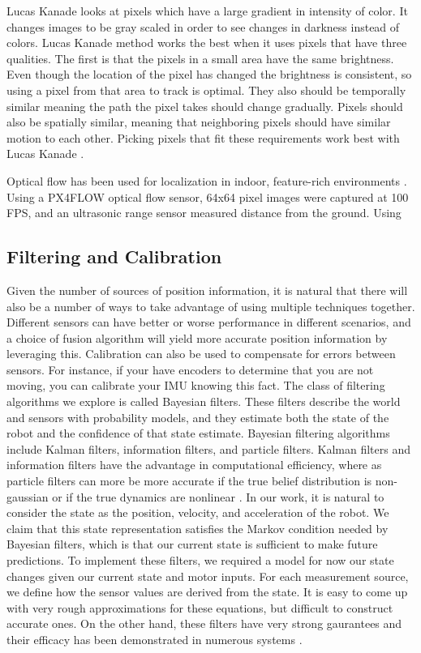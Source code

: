 \documentclass{article}
\begin{document}
    Lucas Kanade looks at pixels which have a large gradient in intensity of color. It changes images to be gray scaled in order to see changes in darkness instead of colors. Lucas Kanade method works the best when it uses pixels that have three qualities. The first is that the pixels in a small area have the same brightness. Even though the location of the pixel has changed the brightness is consistent, so using a pixel from that area to track is optimal. They also should be temporally similar meaning the path the pixel takes should change gradually. Pixels should also be spatially similar, meaning that neighboring pixels should have similar motion to each other. Picking pixels that fit these requirements work best with Lucas Kanade \cite{sun_optical_2008}.

    Optical flow has been used for localization in indoor, feature-rich environments \cite{gao_qingji_onboard_2015}. Using a PX4FLOW optical flow sensor, 64x64 pixel images were captured at 100 FPS, and an ultrasonic range sensor measured distance from the ground. Using

  \subsection{Filtering and Calibration} \label{filtering}

  Given the number of sources of position information, it is natural that there will also be a number of ways to take advantage of using multiple techniques together. Different sensors can have better or worse performance in different scenarios, and a choice of fusion algorithm will yield more accurate position information by leveraging this. Calibration can also be used to compensate for errors between sensors. For instance, if your have encoders to determine that you are not moving, you can calibrate your IMU knowing this fact. The class of filtering algorithms we explore is called Bayesian filters. These filters describe the world and sensors with probability models, and they estimate both the state of the robot and the confidence of that state estimate. Bayesian filtering algorithms include Kalman filters, information filters, and particle filters. Kalman filters and information filters have the advantage in computational efficiency, where as particle filters can more be more accurate if the true belief distribution is non-gaussian or if the true dynamics are nonlinear \cite{thrun_probabilistic_2005}. In our work, it is natural to consider the state as the position, velocity, and acceleration of the robot. We claim that this state representation satisfies the Markov condition needed by Bayesian filters, which is that our current state is sufficient to make future predictions. To implement these filters, we required a model for now our state changes given our current state and motor inputs. For each measurement source, we define how the sensor values are derived from the state. It is easy to come up with very rough approximations for these equations, but difficult to construct accurate ones. On the other hand, these filters have very strong gaurantees and their efficacy has been demonstrated in numerous systems \cite{chui_kalman_1991}\cite{digiampaolo_mobile_2014}\cite{mirzaei_kalman_2008}\cite{nasa_kalman_1999}\cite{saab_standalone_2011}.
\end{document}
